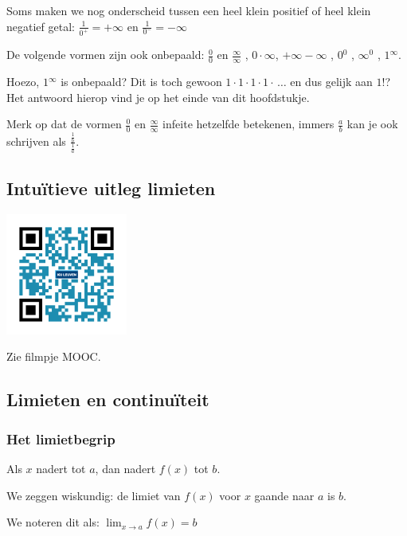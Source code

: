 Soms maken we nog onderscheid tussen een heel klein positief
of heel klein negatief getal: $\frac{1}{0^{+}}=+\infty$ en $\frac{1}{0^{-}}=-\infty$




De volgende vormen zijn ook onbepaald: $\frac{0}{0}$ en
$\frac{\infty}{\infty}$ , $0\cdot \infty$, $+\infty-\infty$ , $0{}^{0}$
, $\infty{}^{0}$ , $1{}^{\infty}$.

Hoezo, $1{}^{\infty}$ is onbepaald? Dit is toch gewoon
$1\cdot 1\cdot 1\cdot 1\cdot \,\ldots$ en dus gelijk aan $1$!? Het antwoord hierop vind
je op het einde van dit hoofdstukje.

Merk op dat de vormen $\frac{0}{0}$ en $\frac{\infty}{\infty}$
infeite hetzelfde betekenen, immers $\frac{a}{b}$ kan je ook schrijven
als $\frac{\frac{1}{b}}{\frac{1}{a}}$.

\subsection{Intu\"itieve uitleg limieten}
\begin{minipage}{.25\linewidth}
	\raggedright
	\includegraphics[width=4cm]{2_elem_rekenvaardigheden_B/inputs/QR_Code_LIMIETEN_module2}
\end{minipage}
\begin{minipage}{.7\linewidth}
	Zie filmpje MOOC.
\end{minipage}

\subsection{Limieten en continu\"iteit}

\subsubsection{Het limietbegrip}

Als $x$ nadert tot $a$, dan nadert $f(x)$ tot $b$.

We zeggen wiskundig: de limiet van $f(x)$ voor $x$ gaande
naar $a$ is $b$.

We noteren dit als: $\lim_{x\to a}f(x)=b$

